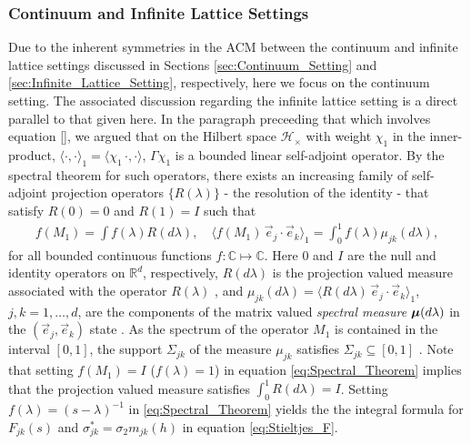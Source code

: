 \documentclass{cmslatex}
\newcommand\bmu{\mbox{\boldmath${\mu}$}}
\begin{document}
\subsubsection{Continuum  and Infinite Lattice Settings}
\label{sec:The_Spectral_Theorem_Continuum} 
%
Due to the inherent symmetries in the ACM between the continuum and
infinite lattice settings discussed in Sections
\ref{sec:Continuum_Setting} and \ref{sec:Infinite_Lattice_Setting},
respectively, here we focus on the continuum setting. The
associated discussion regarding the infinite lattice setting is a
direct parallel to that given here. In the paragraph preceeding that
which involves equation \eqref{}, we argued that on the Hilbert space
$\mathscr{H}_\times$ with weight $\chi_1$ in the inner-product,
$\langle\cdot,\cdot\rangle_1=\langle\chi_1\,\cdot,\cdot\rangle$, $\Gamma\chi_1$ is a bounded linear self-adjoint operator. 
By the spectral theorem for such operators, there exists an increasing
family of self-adjoint projection operators $\{R(\lambda)\}$ - the resolution
of the identity - that satisfy $R(0)=0$ and $R(1)=I$ such that
%
\begin{align}\label{eq:Spectral_Theorem}
  f(M_1)=\int f(\lambda)R(d\lambda), \quad
  \langle f(M_1)\,\vec{e}_j\cdot\vec{e}_k\rangle_1= \int_0^1f(\lambda)\mu_{jk}(d\lambda), 
\end{align}
%
for all bounded continuous functions $f:\mathbb{C}\mapsto\mathbb{C}$. Here
$0$ and $I$ are the null and identity operators on $\mathbb{R}^d$,
respectively, $R(d\lambda)$ is the projection valued measure associated with
the operator $R(\lambda)$ \cite{Reed-1980}, and
$\mu_{jk}(d\lambda)=\langle R(d\lambda)\,\vec{e}_j\cdot\vec{e}_k\rangle_1$, $j,k=1,\ldots,d$, are the
components of the matrix valued \emph{spectral measure} $\bmu(d\lambda)$ in
the $(\vec{e}_j,\vec{e}_k)$ state
\cite{Golden:CMP-473,Reed-1980,Stone:64}. As the spectrum of the
operator $M_1$ is contained in the interval $[0,1]$, the support
$\Sigma_{jk}$ of the measure $\mu_{jk}$ satisfies $\Sigma_{jk}\subseteq[0,1]$
\cite{Reed-1980}. Note that setting $f(M_1)=I$ ($f(\lambda)=1$) in equation
\eqref{eq:Spectral_Theorem} implies that the projection valued measure
satisfies $\int_0^1R(d\lambda)=I$. Setting $f(\lambda)=(s-\lambda)^{-1}$ in
\eqref{eq:Spectral_Theorem} yields the the integral formula for
$F_{jk}(s)$ and $\sigma_{jk}^*=\sigma_2m_{jk}(h)$ in equation \eqref{eq:Stieltjes_F}.
\end{document}
